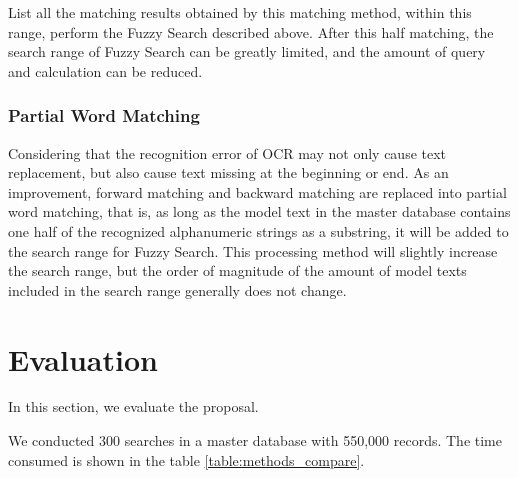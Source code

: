\documentclass[technicalreport]{ieicej}
\begin{document}
            List all the matching results obtained by this matching method, within this range, perform the Fuzzy Search described above. After this half matching, the search range of Fuzzy Search can be greatly limited, and the amount of query and calculation can be reduced.
        
        \subsubsection{Partial Word Matching}
            Considering that the recognition error of OCR may not only cause text replacement, but also cause text missing at the beginning or end. As an improvement, forward matching and backward matching are replaced into partial word matching, that is, as long as the model text in the master database contains one half of the recognized alphanumeric strings as a substring, it will be added to the search range for Fuzzy Search. This processing method will slightly increase the search range, but the order of magnitude of the amount of model texts included in the search range generally does not change.
    
\section{Evaluation}
\label{sec:evaluation}
    In this section, we evaluate the proposal. 
    
    We conducted 300 searches in a master database with 550,000 records. The time consumed is shown in the table \ref{table:methods_compare}.
    
\end{document}
